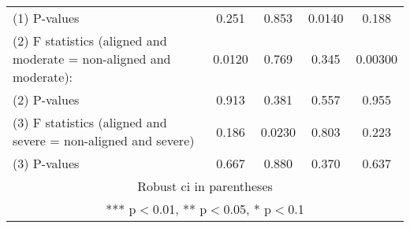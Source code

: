 \begin{tabular}{lcccc}
(1) \hspace{1mm} P-values & 0.251 & 0.853 & 0.0140 & 0.188 \\
(2) F statistics (aligned and moderate = non-aligned and moderate): & 0.0120 & 0.769 & 0.345 & 0.00300 \\
(2) \hspace{1mm} P-values & 0.913 & 0.381 & 0.557 & 0.955 \\
(3) F statistics (aligned and severe = non-aligned and severe) & 0.186 & 0.0230 & 0.803 & 0.223 \\
 (3) \hspace{1mm} P-values & 0.667 & 0.880 & 0.370 & 0.637 \\ \hline
\multicolumn{5}{c}{ Robust ci in parentheses} \\
\multicolumn{5}{c}{ *** p$<$0.01, ** p$<$0.05, * p$<$0.1} \\
\end{tabular}

